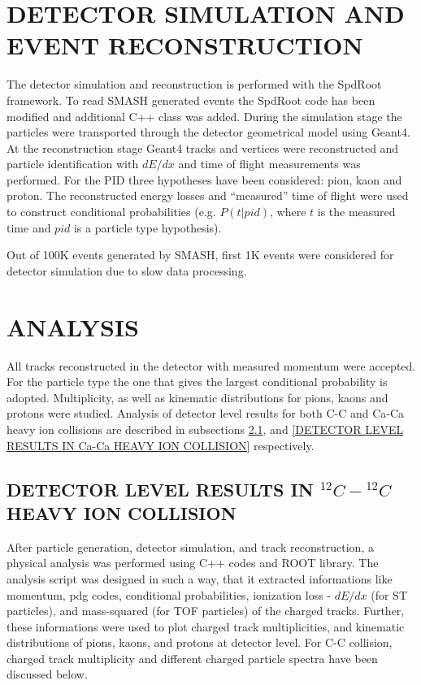 \documentclass[12pt, twocolumn]{article}
\begin{document}
\section{DETECTOR SIMULATION AND EVENT RECONSTRUCTION}
The detector simulation and reconstruction is performed with
the SpdRoot framework. To read SMASH generated events the
SpdRoot code has been modified and additional C++ class
was added.
During the simulation stage the particles
were transported through the detector geometrical model using
Geant4. At the reconstruction stage Geant4 tracks and vertices
were reconstructed and particle identification with $dE/dx$ and
time of flight measurements was performed. For the PID three
hypotheses have been considered: pion, kaon and proton.
The reconstructed energy losses and ``measured'' time of flight
were used to construct conditional probabilities (e.g. $P(t|pid)$,
where $t$ is the measured time and $pid$ is a particle type hypothesis).

Out of 100K events generated by SMASH, first 1K events were considered for detector simulation due to slow data processing.

\section{ANALYSIS}
All tracks reconstructed in the detector with measured 
momentum were accepted. For the particle type the one that
gives the largest conditional probability is adopted. Multiplicity, as well as kinematic distributions for
pions, kaons and protons were studied. Analysis of detector level results for both C-C and Ca-Ca heavy ion collisions are described in subsections \ref{DETECTOR LEVEL RESULTS IN C-C HEAVY ION COLLISION}, and \ref{DETECTOR LEVEL RESULTS IN Ca-Ca HEAVY ION COLLISION} respectively.


\subsection{DETECTOR LEVEL RESULTS IN $^{12}C-{^{12}C}$ HEAVY ION COLLISION}
\label{DETECTOR LEVEL RESULTS IN C-C HEAVY ION COLLISION}
After particle generation, detector simulation, and track reconstruction, a physical analysis was performed using C++ codes and ROOT library. The analysis script was designed in such a way, that it extracted informations like momentum, pdg codes, conditional probabilities, ionization loss - $dE/dx$ (for ST particles), and mass-squared (for TOF particles) of the charged tracks. Further, these informations were used to plot charged track multiplicities, and kinematic distributions of pions, kaons, and protons at detector level. For C-C collision, charged track multiplicity and different charged particle spectra have been discussed below. 
\end{document}

